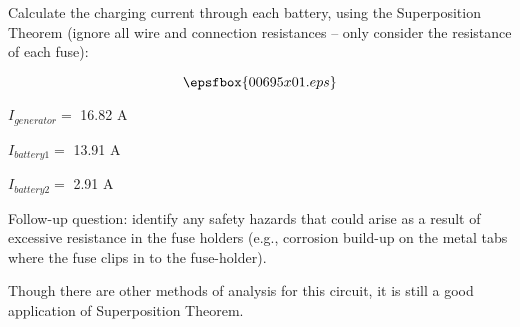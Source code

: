

Calculate the charging current through each battery, using the Superposition Theorem (ignore all wire and connection resistances -- only consider the resistance of each fuse):

$$\epsfbox{00695x01.eps}$$







$I_{generator} =$ 16.82 A

\vskip 10pt

$I_{battery1} =$ 13.91 A

\vskip 10pt

$I_{battery2} =$ 2.91 A

\vskip 10pt

Follow-up question: identify any safety hazards that could arise as a result of excessive resistance in the fuse holders (e.g., corrosion build-up on the metal tabs where the fuse clips in to the fuse-holder).







Though there are other methods of analysis for this circuit, it is still a good application of Superposition Theorem.





